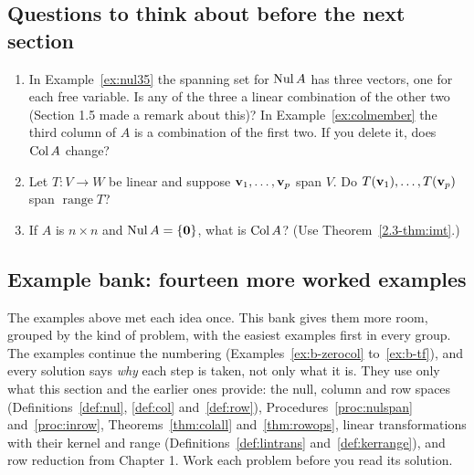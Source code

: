 \documentclass[11pt]{article}
\begin{document}
\subsection*{Questions to think about before the next section}
\begin{enumerate}
  \item In Example~\ref{ex:nul35} the spanning set for $\operatorname{Nul} A$ has three vectors, one for each free variable. Is any of the three a linear combination of the other two (Section 1.5 made a remark about this)? In Example~\ref{ex:colmember} the third column of $A$ is a combination of the first two. If you delete it, does $\operatorname{Col} A$ change?
  \item Let $T:V\to W$ be linear and suppose $\mathbf{v}_1,\dots,\mathbf{v}_p$ span $V$. Do $T(\mathbf{v}_1),\dots,T(\mathbf{v}_p)$ span $\operatorname{range}T$?
  \item If $A$ is $n\times n$ and $\operatorname{Nul} A=\{\mathbf{0}\}$, what is $\operatorname{Col} A$? (Use Theorem~\ref{2.3-thm:imt}.)
\end{enumerate}

\subsection*{Example bank: fourteen more worked examples}

The examples above met each idea once. This bank gives them more room, grouped by the kind of problem, with the easiest examples first in every group. The examples continue the numbering (Examples~\ref{ex:b-zerocol} to~\ref{ex:b-tf}), and every solution says \emph{why} each step is taken, not only what it is. They use only what this section and the earlier ones provide: the null, column and row spaces (Definitions~\ref{def:nul}, \ref{def:col} and~\ref{def:row}), Procedures~\ref{proc:nulspan} and~\ref{proc:inrow}, Theorems~\ref{thm:colall} and~\ref{thm:rowops}, linear transformations with their kernel and range (Definitions~\ref{def:lintrans} and~\ref{def:kerrange}), and row reduction from Chapter 1. Work each problem before you read its solution.
\end{document}
